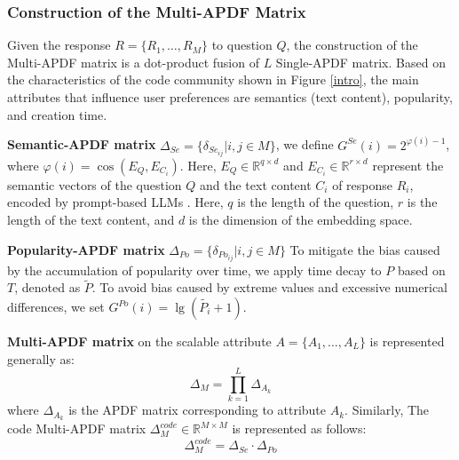 

\subsubsection{Construction of the Multi-APDF Matrix}
Given the response \(R = \{R_1, \ldots, R_M\}\) to question \(Q\), the construction of the Multi-APDF matrix is a dot-product fusion of \(L\) Single-APDF matrix.
Based on the characteristics of the code community shown in Figure \ref{intro}, the main attributes that influence user preferences are semantics (text content), popularity, and creation time. 

\textbf{Semantic-APDF matrix} \(\Delta_{Se} = \{\delta_{Se_{ij}} | i,j \in M\}\), we define \(G^{Se}(i) = 2^{\varphi(i) - 1}\), where \(\varphi(i) = \cos(E_{Q}, E_{C_i})\). Here, \(E_{Q} \in \mathbb{R}^{q \times d}\) and \(E_{C_i} \in \mathbb{R}^{r \times d}\) represent the semantic vectors of the question \(Q\) and the text content \(C_i\) of response \(R_i\), encoded by prompt-based LLMs \cite{behnamghader2024llm2vec}. Here, \(q\) is the length of the question, \(r\) is the length of the text content, and \(d\) is the dimension of the embedding space.

\textbf{Popularity-APDF matrix} \(\Delta_{Po} = \{\delta_{Po_{ij}} | i,j \in M\}\)
To mitigate the bias caused by the accumulation of popularity over time, we apply time decay to \(P\) based on \(T\), denoted as \(\tilde{P}\). 
To avoid bias caused by extreme values and excessive numerical differences, we set \(G^{Po}(i) = \lg(\tilde{P_i} + 1)\).

\textbf{Multi-APDF matrix} on the scalable attribute \( A = \{ A_1, \ldots, A_L \} \) is represented generally as:
\begin{equation}
  \label{muapdf}
    \Delta_{M} =  {\textstyle \prod_{k=1}^{L}}  \Delta_{A_k}
\end{equation}
where \( \Delta_{A_k} \) is the APDF matrix corresponding to attribute \( A_k \). Similarly, The code Multi-APDF matrix \(\Delta_{M}^{code} \in \mathbb{R}^{M \times M}\) is represented as follows:
\begin{equation}
    \Delta_{M}^{code} = \Delta_{Se} \cdot \Delta_{Po}
\end{equation}








